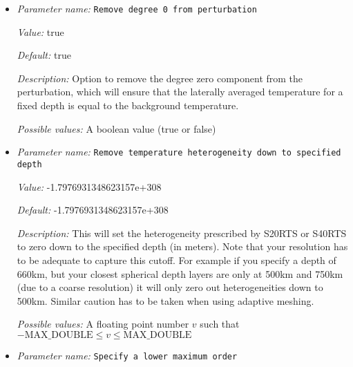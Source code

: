 \begin{itemize}
{\it Value:} 1600.0


{\it Default:} 1600.0


{\it Description:} The reference temperature that is perturbed by the spherical harmonic functions. Only used in incompressible models.


{\it Possible values:} A floating point number $v$ such that $0 \leq v \leq \text{MAX\_DOUBLE}$
\item {\it Parameter name:} {\tt Remove degree 0 from perturbation}
\label{parameters:Initial temperature model/S40RTS perturbation/Remove degree 0 from perturbation}


{\it Value:} true


{\it Default:} true


{\it Description:} Option to remove the degree zero component from the perturbation, which will ensure that the laterally averaged temperature for a fixed depth is equal to the background temperature.


{\it Possible values:} A boolean value (true or false)
\item {\it Parameter name:} {\tt Remove temperature heterogeneity down to specified depth}
\label{parameters:Initial temperature model/S40RTS perturbation/Remove temperature heterogeneity down to specified depth}


{\it Value:} -1.7976931348623157e+308


{\it Default:} -1.7976931348623157e+308


{\it Description:} This will set the heterogeneity prescribed by S20RTS or S40RTS to zero down to the specified depth (in meters). Note that your resolution has to be adequate to capture this cutoff. For example if you specify a depth of 660km, but your closest spherical depth layers are only at 500km and 750km (due to a coarse resolution) it will only zero out heterogeneities down to 500km. Similar caution has to be taken when using adaptive meshing.


{\it Possible values:} A floating point number $v$ such that $-\text{MAX\_DOUBLE} \leq v \leq \text{MAX\_DOUBLE}$
\item {\it Parameter name:} {\tt Specify a lower maximum order}
\label{parameters:Initial temperature model/S40RTS perturbation/Specify a lower maximum order}



\end{itemize}
